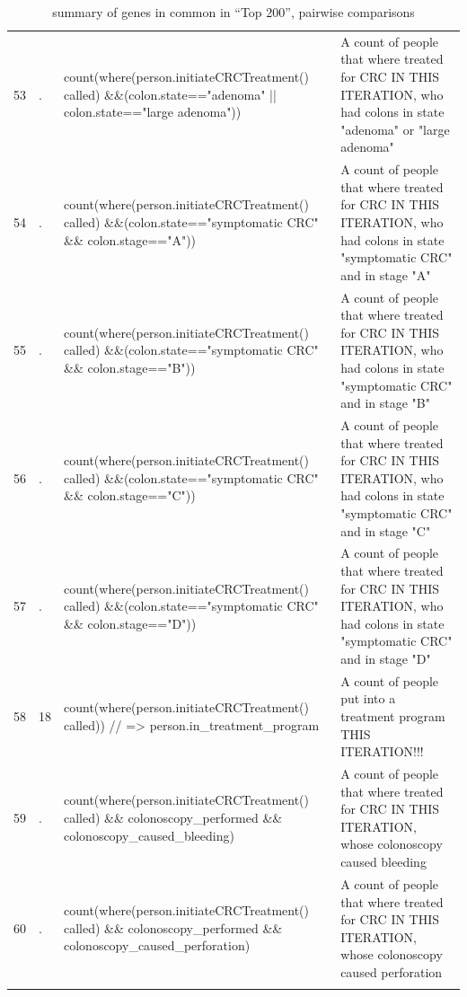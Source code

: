 \documentclass[11pt]{article}
\begin{document}
\begin{landscape}
\begin{longtable}{||l|l|p{11.3cm}|p{11.3cm}||}
53           & .       & count(where(person.initiateCRCTreatment() called)    \&\&(colon.state=="adenoma" || colon.state=="large adenoma"))                            & A count of people that where treated for CRC IN THIS ITERATION, who had colons in state "adenoma" or "large adenoma" \\
54           & .       & count(where(person.initiateCRCTreatment() called)   \&\&(colon.state=="symptomatic CRC" \&\& colon.stage=="A"))                            & A count of people that where treated for CRC IN THIS ITERATION, who had colons in state "symptomatic CRC" and in stage "A" \\
55           & .       & count(where(person.initiateCRCTreatment() called)             \&\&(colon.state=="symptomatic CRC" \&\& colon.stage=="B"))                        & A count of people that where treated for CRC IN THIS ITERATION, who had colons in state "symptomatic CRC" and in stage "B" \\
56           & .       & count(where(person.initiateCRCTreatment() called)                \&\&(colon.state=="symptomatic CRC" \&\& colon.stage=="C"))                 & A count of people that where treated for CRC IN THIS ITERATION, who had colons in state "symptomatic CRC" and in stage "C" \\
57           & .       & count(where(person.initiateCRCTreatment() called)       \&\&(colon.state=="symptomatic CRC" \&\& colon.stage=="D"))                          & A count of people that where treated for CRC IN THIS ITERATION, who had colons in state "symptomatic CRC" and in stage "D" \\
58           & 18      & count(where(person.initiateCRCTreatment() called))   // => person.in\_treatment\_program                               & A count of people put into a treatment program THIS ITERATION!!! \\
59           & .       & count(where(person.initiateCRCTreatment() called)    \&\& colonoscopy\_performed \&\& colonoscopy\_caused\_bleeding)                              & A count of people that where treated for CRC IN THIS ITERATION, whose colonoscopy caused bleeding \\
60           & .       & count(where(person.initiateCRCTreatment() called)   \&\& colonoscopy\_performed \&\& colonoscopy\_caused\_perforation)                              & A count of people that where treated for CRC IN THIS ITERATION, whose colonoscopy caused perforation \\
\hline
  \caption{summary of genes in common in ``Top 200'', pairwise comparisons}
  \label{table:summary}
\end{longtable}
\end{landscape}
\end{document}
